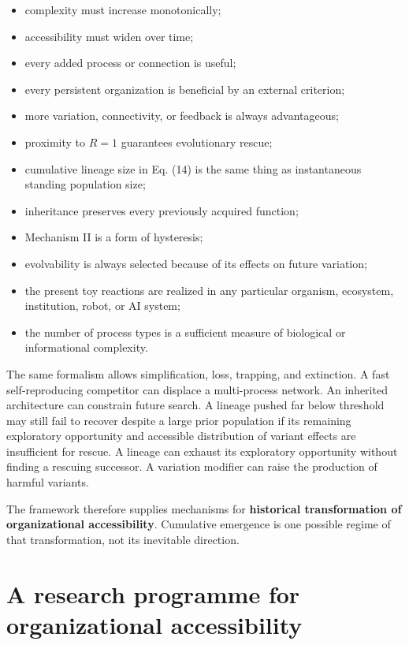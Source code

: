 \documentclass[11pt,a4paper]{article}
\providecommand{\tightlist}{%
  \setlength{\itemsep}{0pt}\setlength{\parskip}{0pt}}
\begin{document}
\begin{itemize}
\tightlist
\item
  complexity must increase monotonically;
\item
  accessibility must widen over time;
\item
  every added process or connection is useful;
\item
  every persistent organization is beneficial by an external criterion;
\item
  more variation, connectivity, or feedback is always advantageous;
\item
  proximity to \(R=1\) guarantees evolutionary rescue;
\item
  cumulative lineage size in Eq. (14) is the same thing as instantaneous
  standing population size;
\item
  inheritance preserves every previously acquired function;
\item
  Mechanism II is a form of hysteresis;
\item
  evolvability is always selected because of its effects on future
  variation;
\item
  the present toy reactions are realized in any particular organism,
  ecosystem, institution, robot, or AI system;
\item
  the number of process types is a sufficient measure of biological or
  informational complexity.
\end{itemize}

The same formalism allows simplification, loss, trapping, and
extinction. A fast self-reproducing competitor can displace a
multi-process network. An inherited architecture can constrain future
search. A lineage pushed far below threshold may still fail to recover
despite a large prior population if its remaining exploratory
opportunity and accessible distribution of variant effects are
insufficient for rescue. A lineage can exhaust its exploratory
opportunity without finding a rescuing successor. A variation modifier
can raise the production of harmful variants.

The framework therefore supplies mechanisms for \textbf{historical
transformation of organizational accessibility}. Cumulative emergence is
one possible regime of that transformation, not its inevitable
direction.

\section{A research programme for organizational
accessibility}\label{a-research-programme-for-organizational-accessibility}
\end{document}
